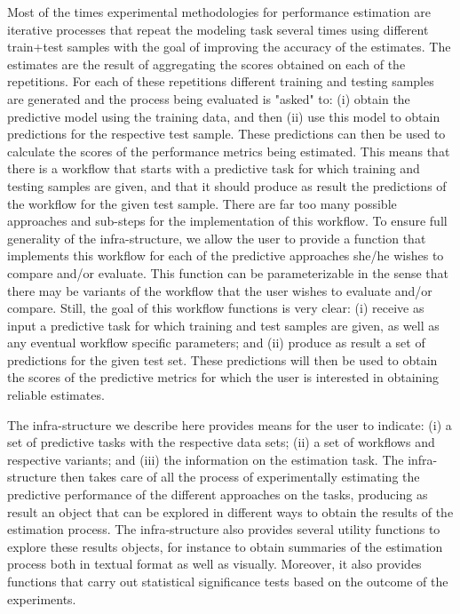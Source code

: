 \documentclass[10pt,a4paper]{article}\usepackage[]{graphicx}\usepackage[]{color}
\begin{document}
Most of the times experimental methodologies for performance estimation are iterative
processes that repeat the modeling task several times using different
train+test samples with the goal of improving the accuracy of the
estimates. The estimates are the result of aggregating the scores
obtained on each of the repetitions. For each of these
repetitions different training and testing samples are generated and
the process being evaluated is "asked" to: (i) obtain the predictive
model using the training data, and then (ii) use this model to obtain
predictions for the respective test sample. These predictions can then be
used to calculate the scores of the performance metrics being
estimated. This means that there is a workflow that starts with a
predictive task for which training and testing samples are given, and
that it should produce as result the predictions of the workflow for
the given test sample. There are far too many possible approaches and
sub-steps for the implementation of this workflow.  To ensure full
generality of the infra-structure, we allow the user to provide a
function that implements this workflow for each of the predictive
approaches she/he wishes to compare and/or evaluate. This function can
be parameterizable in the sense that there may be variants of the
workflow that the user wishes to evaluate and/or compare. Still, the
goal of this workflow  functions is very clear: (i)
receive as input a predictive task for which training  and  test
samples are given, as well as any eventual workflow specific parameters; and
(ii) produce as result a set of predictions for the given test
set.  These predictions
will then be used to obtain the scores of the predictive metrics for which the
user is interested in obtaining reliable estimates.

The infra-structure we describe here provides means for the user to
indicate: (i) a set of predictive tasks with the respective data sets;
(ii) a set of workflows and respective variants; and (iii) the
information on the estimation task. The infra-structure then takes care of all
the process of experimentally estimating the predictive performance of the different approaches on
the tasks, producing as result an object that can be
explored in different ways to obtain the results of the estimation process.
The infra-structure also provides several utility functions
to explore these results objects, for instance to
obtain summaries of the estimation process both in textual format as well as
visually. Moreover, it also provides functions that carry out
statistical significance tests based on the outcome of the
experiments. 
\end{document}
